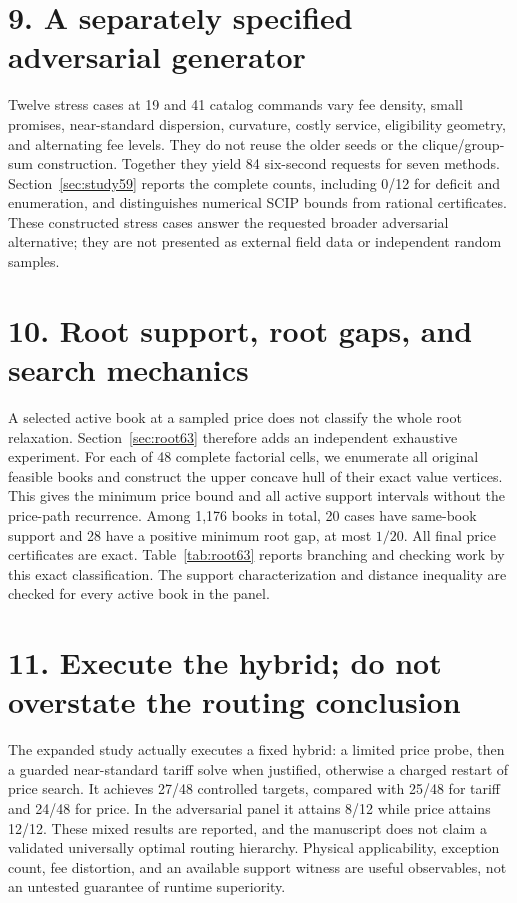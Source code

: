 \documentclass[11pt,letterpaper]{article}
\theoremstyle{definition}\newtheorem{remark}[theorem]{Remark}
\begin{document}
\section*{9. A separately specified adversarial generator}
Twelve stress cases at 19 and 41 catalog commands vary fee density, small promises, near-standard dispersion, curvature, costly service, eligibility geometry, and alternating fee levels. They do not reuse the older seeds or the clique/group-sum construction. Together they yield 84 six-second requests for seven methods. Section~\ref{sec:study59} reports the complete counts, including 0/12 for deficit and enumeration, and distinguishes numerical SCIP bounds from rational certificates. These constructed stress cases answer the requested broader adversarial alternative; they are not presented as external field data or independent random samples.

\section*{10. Root support, root gaps, and search mechanics}
A selected active book at a sampled price does not classify the whole root relaxation. Section~\ref{sec:root63} therefore adds an independent exhaustive experiment. For each of 48 complete factorial cells, we enumerate all original feasible books and construct the upper concave hull of their exact value vertices. This gives the minimum price bound and all active support intervals without the price-path recurrence. Among 1,176 books in total, 20 cases have same-book support and 28 have a positive minimum root gap, at most $1/20$. All final price certificates are exact. Table~\ref{tab:root63} reports branching and checking work by this exact classification. The support characterization and distance inequality are checked for every active book in the panel.

\section*{11. Execute the hybrid; do not overstate the routing conclusion}
The expanded study actually executes a fixed hybrid: a limited price probe, then a guarded near-standard tariff solve when justified, otherwise a charged restart of price search. It achieves 27/48 controlled targets, compared with 25/48 for tariff and 24/48 for price. In the adversarial panel it attains 8/12 while price attains 12/12. These mixed results are reported, and the manuscript does not claim a validated universally optimal routing hierarchy. Physical applicability, exception count, fee distortion, and an available support witness are useful observables, not an untested guarantee of runtime superiority.
\end{document}
